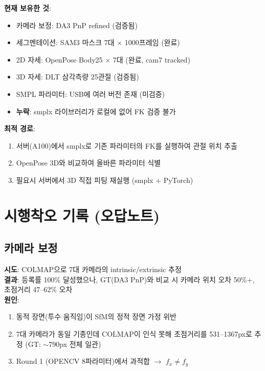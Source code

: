 \documentclass[11pt, a4paper]{report}
\begin{document}
\begin{keyidea}
\textbf{현재 보유한 것}:
\begin{itemize}[nosep]
  \item 카메라 보정: DA3 PnP refined (검증됨)
  \item 세그멘테이션: SAM3 마스크 7대 $\times$ 1000프레임 (완료)
  \item 2D 자세: OpenPose Body25 $\times$ 7대 (완료, cam7 tracked)
  \item 3D 자세: DLT 삼각측량 25관절 (검증됨)
  \item SMPL 파라미터: USB에 여러 버전 존재 (미검증)
  \item \textbf{누락}: smplx 라이브러리가 로컬에 없어 FK 검증 불가
\end{itemize}

\textbf{최적 경로}:
\begin{enumerate}[nosep]
  \item 서버(A100)에서 smplx로 기존 파라미터의 FK를 실행하여 관절 위치 추출
  \item OpenPose 3D와 비교하여 올바른 파라미터 식별
  \item 필요시 서버에서 3D 직접 피팅 재실행 (smplx + PyTorch)
\end{enumerate}
\end{keyidea}


\chapter{시행착오 기록 (오답노트)}

\section{카메라 보정}

\begin{failbox}[title={실패 1: COLMAP SfM 카메라 보정}]
\textbf{시도}: COLMAP으로 7대 카메라의 intrinsic/extrinsic 추정\\
\textbf{결과}: 등록률 100\% 달성했으나, GT(DA3 PnP)와 비교 시 카메라 위치 오차 50\%+, 초점거리 47--62\% 오차\\
\textbf{원인}:
\begin{enumerate}[nosep]
  \item 동적 장면(투수 움직임)이 SfM의 정적 장면 가정 위반
  \item 7대 카메라가 동일 기종인데 COLMAP이 인식 못해 초점거리를 531--1367px로 추정 (GT: $\sim$790px 전체 일관)
  \item Round 1 (OPENCV 8파라미터)에서 과적합 $\rightarrow$ $f_x \neq f_y$
\end{enumerate}
\end{failbox}
\end{document}
